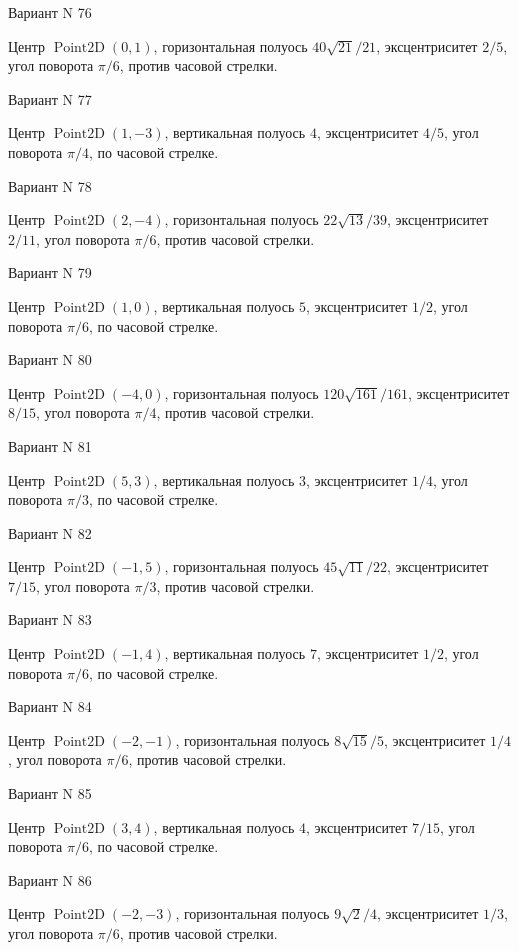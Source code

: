 \documentclass[11pt]{report}
\begin{document}
Вариант N 76

Центр $\operatorname{Point2D}\left(0, 1\right)$, горизонтальная полуось $40 \sqrt{21} / 21$, эксцентриситет $2 / 5$, угол поворота $\pi / 6$, против часовой стрелки.

Вариант N 77

Центр $\operatorname{Point2D}\left(1, -3\right)$, вертикальная полуось $4$, эксцентриситет $4 / 5$, угол поворота $\pi / 4$, по часовой стрелке.

Вариант N 78

Центр $\operatorname{Point2D}\left(2, -4\right)$, горизонтальная полуось $22 \sqrt{13} / 39$, эксцентриситет $2 / 11$, угол поворота $\pi / 6$, против часовой стрелки.

Вариант N 79

Центр $\operatorname{Point2D}\left(1, 0\right)$, вертикальная полуось $5$, эксцентриситет $1 / 2$, угол поворота $\pi / 6$, по часовой стрелке.

Вариант N 80

Центр $\operatorname{Point2D}\left(-4, 0\right)$, горизонтальная полуось $120 \sqrt{161} / 161$, эксцентриситет $8 / 15$, угол поворота $\pi / 4$, против часовой стрелки.

Вариант N 81

Центр $\operatorname{Point2D}\left(5, 3\right)$, вертикальная полуось $3$, эксцентриситет $1 / 4$, угол поворота $\pi / 3$, по часовой стрелке.

Вариант N 82

Центр $\operatorname{Point2D}\left(-1, 5\right)$, горизонтальная полуось $45 \sqrt{11} / 22$, эксцентриситет $7 / 15$, угол поворота $\pi / 3$, против часовой стрелки.

Вариант N 83

Центр $\operatorname{Point2D}\left(-1, 4\right)$, вертикальная полуось $7$, эксцентриситет $1 / 2$, угол поворота $\pi / 6$, по часовой стрелке.

Вариант N 84

Центр $\operatorname{Point2D}\left(-2, -1\right)$, горизонтальная полуось $8 \sqrt{15} / 5$, эксцентриситет $1 / 4$, угол поворота $\pi / 6$, против часовой стрелки.

Вариант N 85

Центр $\operatorname{Point2D}\left(3, 4\right)$, вертикальная полуось $4$, эксцентриситет $7 / 15$, угол поворота $\pi / 6$, по часовой стрелке.

Вариант N 86

Центр $\operatorname{Point2D}\left(-2, -3\right)$, горизонтальная полуось $9 \sqrt{2} / 4$, эксцентриситет $1 / 3$, угол поворота $\pi / 6$, против часовой стрелки.
\end{document}

